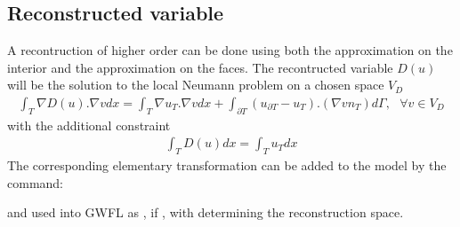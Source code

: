 \documentclass[a4paper,11pt,english]{sphinxmanual}
\begin{document}
\subsection{Reconstructed variable}
\label{\detokenize{userdoc/hho:reconstructed-variable}}
A recontruction of higher order can be done using both the approximation on the interior and the approximation on the faces. The recontructed variable \(D(u)\) will be the solution to the local Neumann problem on a chosen space \(V_D\)
\begin{equation*}
\begin{split}\int_T \nabla D(u). \nabla v dx = \int_T \nabla u_T . \nabla v dx + \int_{\partial T} (u_{\partial T} - u_{T}).(\nabla v n_T) d\Gamma, ~~~ \forall v \in V_D\end{split}
\end{equation*}
with the additional constraint
\begin{equation*}
\begin{split}\int_T D(u) dx = \int_T u_T dx\end{split}
\end{equation*}
The corresponding elementary transformation can be added to the model by the command:

\begin{sphinxVerbatim}[commandchars=\\\{\}]
 
\end{sphinxVerbatim}

and used into GWFL as , if , with  determining the reconstruction space.
\end{document}
